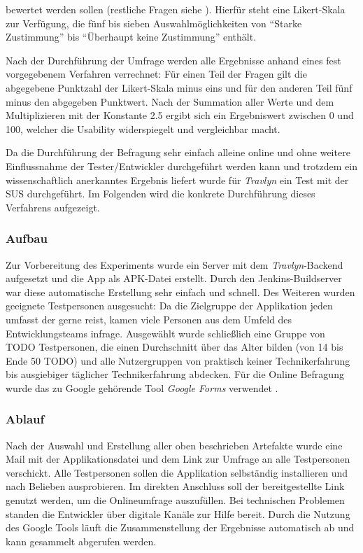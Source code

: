 bewertet werden sollen (restliche Fragen siehe \cite{Brooke.1996}). Hierfür steht eine Likert-Skala \cite{Joshi.2015} zur Verfügung, die fünf bis sieben Auswahlmöglichkeiten von \enquote{Starke Zustimmung} bis \enquote{Überhaupt keine Zustimmung} enthält.

\vspace{0.25cm}

Nach der Durchführung der Umfrage werden alle Ergebnisse anhand eines fest vorgegebenem Verfahren verrechnet: Für einen Teil der Fragen gilt die abgegebene Punktzahl der Likert-Skala minus eins und für den anderen Teil fünf minus den abgegeben Punktwert. Nach der Summation aller Werte und dem Multiplizieren mit der Konstante 2.5 ergibt sich ein Ergebniswert zwischen 0 und 100, welcher die Usability widerspiegelt und vergleichbar macht.

\vspace{0.25cm}

Da die Durchführung der Befragung sehr einfach alleine online und ohne weitere Einflussnahme der Tester/Entwickler durchgeführt werden kann und trotzdem ein wissenschaftlich anerkanntes Ergebnis liefert wurde für \textit{Travlyn} ein Test mit der \acs{SUS} durchgeführt. Im Folgenden wird die konkrete Durchführung dieses Verfahrens aufgezeigt.    
	
		\subsubsection{Aufbau}
		Zur Vorbereitung des Experiments wurde ein Server mit dem \textit{Travlyn}-Backend aufgesetzt und die App als \acs{APK}-Datei erstellt. Durch den Jenkins-Buildserver war diese automatische Erstellung sehr einfach und schnell. Des Weiteren wurden geeignete Testpersonen ausgesucht: Da die Zielgruppe der Applikation jeden umfasst der gerne reist, kamen viele Personen aus dem Umfeld des Entwicklungsteams infrage. Ausgewählt wurde schließlich eine Gruppe von TODO Testpersonen, die einen Durchschnitt über das Alter bilden (von 14 bis Ende 50 TODO) und alle Nutzergruppen von praktisch keiner Technikerfahrung bis ausgiebiger täglicher Technikerfahrung abdecken. Für die Online Befragung wurde das zu Google gehörende Tool \textit{Google Forms} verwendet \cite{Google.2020}.
		
		\subsubsection{Ablauf}
		Nach der Auswahl und Erstellung aller oben beschrieben Artefakte wurde eine Mail mit der Applikationsdatei und dem Link zur Umfrage an alle Testpersonen verschickt. Alle Testpersonen sollen die Applikation selbständig installieren und nach Belieben ausprobieren. Im direkten Anschluss soll der bereitgestellte Link genutzt werden, um die Onlineumfrage auszufüllen. Bei technischen Problemen standen die Entwickler über digitale Kanäle zur Hilfe bereit.
		Durch die Nutzung des Google Tools läuft die Zusammenstellung der Ergebnisse automatisch ab und kann gesammelt abgerufen werden.  
